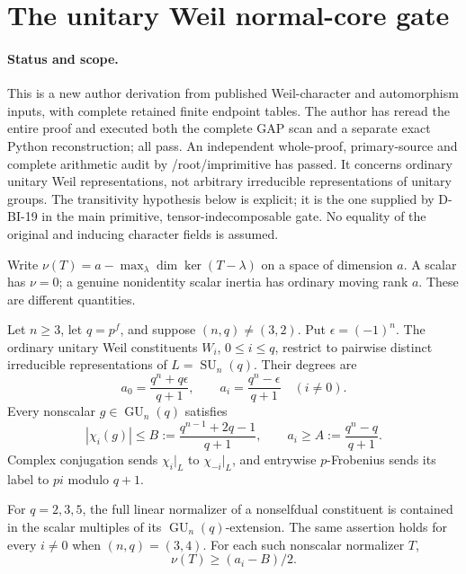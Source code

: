 \section{The unitary Weil normal-core gate}
\label{sec:unitary-weil-core}

\paragraph{Status and scope.}
This is a new author derivation from published Weil-character and
automorphism inputs, with complete retained finite endpoint tables.
The author has reread the entire proof and executed both the complete
GAP scan and a separate exact Python reconstruction; all pass.
An independent whole-proof, primary-source and complete arithmetic
audit by /root/imprimitive has passed. It concerns
ordinary unitary Weil representations, not arbitrary irreducible
representations of unitary groups. The transitivity hypothesis below
is explicit; it is the one supplied by D-BI-19 in the main primitive,
tensor-indecomposable gate. No equality of the original and inducing
character fields is assumed.

Write $\nu(T)=a-\max_\lambda\dim\ker(T-\lambda)$ on a space of
dimension $a$. A scalar has $\nu=0$; a genuine nonidentity scalar
inertia has ordinary moving rank $a$. These are different quantities.

\begin{lemma}
\label{D-BI-24a}
Let $n\ge3$, let $q=p^f$, and suppose $(n,q)\ne(3,2)$.
Put $\epsilon=(-1)^n$. The ordinary unitary Weil constituents
$W_i$, $0\le i\le q$, restrict to pairwise distinct irreducible
representations of $L=\operatorname{SU}_n(q)$. Their degrees are
\[
 a_0=\frac{q^n+q\epsilon}{q+1},\qquad
 a_i=\frac{q^n-\epsilon}{q+1}\quad(i\ne0).                  \tag{UW.1}
\]
Every nonscalar $g\in\operatorname{GU}_n(q)$ satisfies
\[
 |\chi_i(g)|\le B:=\frac{q^{n-1}+2q-1}{q+1},\qquad
 a_i\ge A:=\frac{q^n-q}{q+1}.                              \tag{UW.2}
\]
Complex conjugation sends $\chi_i|_L$ to $\chi_{-i}|_L$,
and entrywise $p$-Frobenius sends its label to $pi$ modulo $q+1$.

For $q=2,3,5$, the full linear normalizer of a nonselfdual
constituent is contained in the scalar multiples of its
$\operatorname{GU}_n(q)$-extension. The same assertion holds
for every $i\ne0$ when $(n,q)=(3,4)$.
For each such nonscalar normalizer $T$,
\[
                      \nu(T)\ge(a_i-B)/2.                  \tag{UW.3}
\]
\end{lemma}

